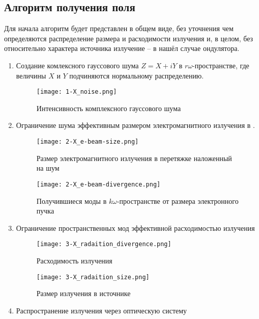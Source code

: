 \subsection{Алгоритм получения поля}
Для начала алгоритм будет представлен в общем виде, без уточнения чем определяются распределение размера и расходимости излучения и, в целом, без относительно характера источника излучение -- в нашёл случае ондулятора. 
\begin{enumerate}
\item Создание комлексного гауссового шума $Z = X + iY$ в $r\omega$-пространстве, где величины $X$ и $Y$ подчиняются нормальному распределению.
\begin{figure}[H] 
	\centering 	\texttt{[image: 1-X\_noise.png]}
	\caption{Интенсивность комплексного гауссового шума}
	\label{fig:1-noise}
\end{figure}
\item Ограничение шума эффективным размером электромагнитного излучения в .
\begin{figure}[H]
	\centering
	\begin{minipage}{0.45\textwidth}
		\centering
		\texttt{[image: 2-X\_e-beam-size.png]}
		\caption{Размер электромагнитного излучения в перетяжке наложенный на шум}
		\label{fig:2-beam_size_k}
	\end{minipage}
	\begin{minipage}{0.45\textwidth}
		\centering
		\texttt{[image: 2-X\_e-beam-divergence.png]}
		\caption{Получившиеся моды в $k\omega$-пространстве от размера электронного пучка}
		\label{fig:2-beam_size_s}
	\end{minipage}\hfill
\end{figure}
\item Ограничение пространственных мод эффективной расходимостью излучения
\begin{figure}[H]
	\centering
	\begin{minipage}{0.45\textwidth}
		\centering
		\texttt{[image: 3-X\_radaition\_divergence.png]}
		\caption{Расходимость излучения}
		\label{fig:3-beam_s}
	\end{minipage}
	\begin{minipage}{0.45\textwidth}
		\centering
		\texttt{[image: 3-X\_radaition\_size.png]}
		\caption{Размер излучения в источнике}
		\label{fig:3-beam_k}
	\end{minipage}
\end{figure}
\item Распространение излучения через оптическую систему
\end{enumerate}


